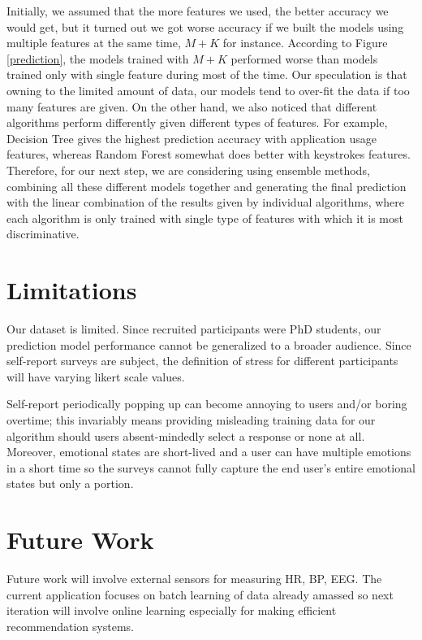 \documentclass{article}
\begin{document}
Initially, we assumed that the more features we used, the better accuracy we would get, but it turned out we got worse accuracy if we built the models using multiple features at the same time, $M+K$ for instance. According to Figure \ref{prediction}, the models trained with $M+K$ performed worse than models trained only with single feature during most of the time. Our speculation is that owning to the limited amount of data, our models tend to over-fit the data if too many features are given. On the other hand, we also noticed that different algorithms perform differently given different types of features. For example, Decision Tree gives the highest prediction accuracy with application usage features, whereas Random Forest somewhat does better with keystrokes features. Therefore, for our next step, we are considering using ensemble methods, combining all these different models together and generating the final prediction with the linear combination of the results given by individual algorithms, where each algorithm is only trained with single type of features with which it is most discriminative.  


 
\section{Limitations}
Our dataset is limited. Since recruited participants were PhD students, our prediction model performance cannot be generalized to a broader audience. Since self-report surveys are subject, the definition of stress for different participants will have varying likert scale values. 

Self-report periodically popping up can become annoying to users and/or boring overtime; this invariably means providing misleading training data for our algorithm should users absent-mindedly select a response or none at all. Moreover, emotional states are short-lived and a user can have multiple emotions in a short time so the surveys cannot fully capture the end user's entire emotional states but only a portion.

\section{Future Work}
Future work will involve external sensors for measuring HR, BP, EEG. The current application focuses on batch learning of data already amassed so next iteration will involve online learning especially for making efficient recommendation systems. 
\end{document}
